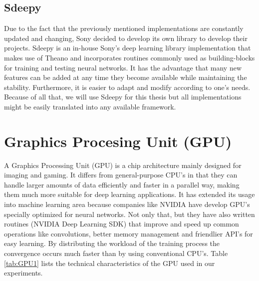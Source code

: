 \FloatBarrier
     
\subsection{Sdeepy}
Due to the fact that the previously mentioned implementations are constantly updated and changing, Sony decided to develop its own library to develop their projects. Sdeepy is an in-house Sony's deep learning library implementation that makes use of Theano and incorporates routines commonly used as building-blocks for training and testing neural networks. It has the advantage that many new features can be added at any time they become available while maintaining the stability. Furthermore, it is easier to adapt and modify according to one's needs. Because of all that, we will use Sdeepy for this thesis but all implementations might be easily translated into any available framework.

\FloatBarrier

\section{Graphics Procesing Unit (GPU)}
A Graphics Processing Unit (GPU) is a chip architecture mainly designed for imaging and gaming. It differs from general-purpose CPU's in that they can handle larger amounts of data efficiently and faster in a parallel way, making them much more suitable for deep learning applications. It has extended its usage into machine learning area because companies like NVIDIA have develop GPU's specially optimized for neural networks. Not only that, but they have also written routines (NVIDIA Deep Learning SDK) that improve and speed up common operations like convolutions, better memory management and friendlier API's for easy learning. By distributing the workload of the training process the convergence occurs much faster than by using conventional CPU's. Table \ref{tab:GPU1} lists the technical characteristics of the GPU used in our experiments.

\vspace{1cm}    

